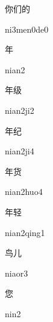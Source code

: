 \begin{verbete}[ni3men0de0]{你们的}
\begin{pronuncia}{ni3men0de0}
\end{pronuncia}
\end{verbete}

\begin{verbete}[nian2]{年}
\begin{pronuncia}{nian2}
\end{pronuncia}
\end{verbete}

\begin{verbete}[nian2ji2]{年级}
\begin{pronuncia}{nian2ji2}
\end{pronuncia}
\end{verbete}

\begin{verbete}[nian2ji4]{年纪}
\begin{pronuncia}{nian2ji4}
\end{pronuncia}
\end{verbete}

\begin{verbete}{年货}
\begin{pronuncia}{nian2huo4}
\end{pronuncia}
\end{verbete}

\begin{verbete}{年轻}
\begin{pronuncia}{nian2qing1}
\end{pronuncia}
\end{verbete}

\begin{verbete}[niaor3]{鸟儿}
\begin{pronuncia}{niaor3}
\end{pronuncia}
\end{verbete}

\begin{verbete}[nin2]{您}
\begin{pronuncia}{nin2}
\end{pronuncia}
\end{verbete}

